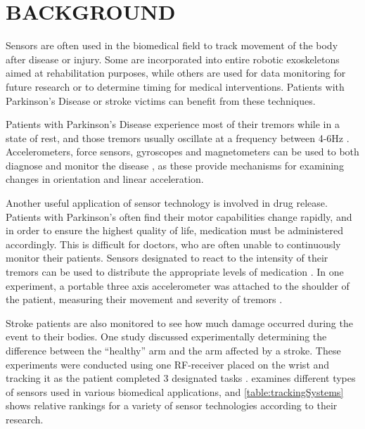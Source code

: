 \documentclass[letterpaper, 10 pt, conference]{ieeeconf}  %
\begin{document}
\section{BACKGROUND}
Sensors are often used in the biomedical field to track movement of the body after disease or injury. Some are incorporated into entire robotic exoskeletons aimed at rehabilitation purposes, while others are used for data monitoring for future research or to determine timing for medical interventions. Patients with Parkinson’s Disease or stroke victims can benefit from these techniques.

Patients with Parkinson’s Disease experience most of their tremors while in a state of rest, and those tremors usually oscillate at a frequency between 4-6Hz \cite{Perumal}. Accelerometers, force sensors, gyroscopes and magnetometers can be used to both diagnose and monitor the disease \cite{Perumal}, as these provide mechanisms for examining changes in orientation and linear acceleration.

Another useful application of sensor technology is involved in drug release. Patients with Parkinson’s often find their motor capabilities change rapidly, and in order to ensure the highest quality of life, medication must be administered accordingly. This is difficult for doctors, who are often unable to continuously monitor their patients. Sensors designated to react to the intensity of their tremors can be used to distribute the appropriate levels of medication \cite{Patel}. In one experiment, a portable three axis accelerometer was attached to the shoulder of the patient, measuring their movement and severity of tremors \cite{Patel}.

Stroke patients are also monitored to see how much damage occurred during the event to their bodies. One study discussed experimentally determining the difference between the “healthy” arm and the arm affected by a stroke. These experiments were conducted using one RF-receiver placed on the wrist and tracking it as the patient completed 3 designated tasks \cite{Sokal}.
\cite{Zhou} examines different types of sensors used in various biomedical applications, and \autoref{table:trackingSystems} shows relative rankings for a variety of sensor technologies according to their research.
\end{document}
